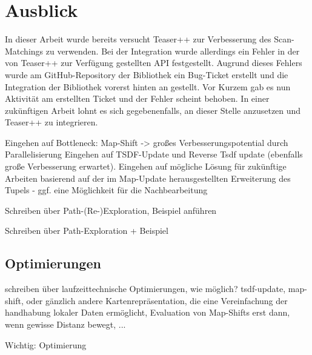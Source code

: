 \section{Ausblick}

In dieser Arbeit wurde bereits versucht Teaser++ zur Verbesserung des Scan-Matchings zu verwenden. Bei der Integration wurde allerdings ein Fehler in der von Teaser++ zur Verfügung gestellten API festgestellt. Augrund dieses Fehlers wurde am GitHub-Repository der Bibliothek ein Bug-Ticket erstellt und die Integration der Bibliothek vorerst hinten an gestellt. Vor Kurzem gab es nun Aktivität am erstellten Ticket und der Fehler scheint behoben. In einer zukünftigen Arbeit lohnt es sich gegebenenfalls, an dieser Stelle anzusetzen und Teaser++ zu integrieren.

Eingehen auf Bottleneck: Map-Shift -> großes Verbesserungspotential durch Parallelisierung
Eingehen auf TSDF-Update und Reverse Tsdf update (ebenfalls große Verbesserung erwartet).
Eingehen auf mögliche Lösung für zukünftige Arbeiten basierend auf der im Map-Update herausgestellten Erweiterung des Tupels - ggf. eine Möglichkeit für die Nachbearbeitung

Schreiben über Path-(Re-)Exploration, Beispiel anführen

Schreiben über Path-Exploration + Beispiel

\subsection{Optimierungen}

schreiben über laufzeittechnische Optimierungen, wie möglich?
tsdf-update, map-shift, oder gänzlich andere Kartenrepräsentation, die eine Vereinfachung der handhabung lokaler Daten ermöglicht, Evaluation von Map-Shifts erst dann, wenn gewisse Distanz bewegt, ...

Wichtig: Optimierung
